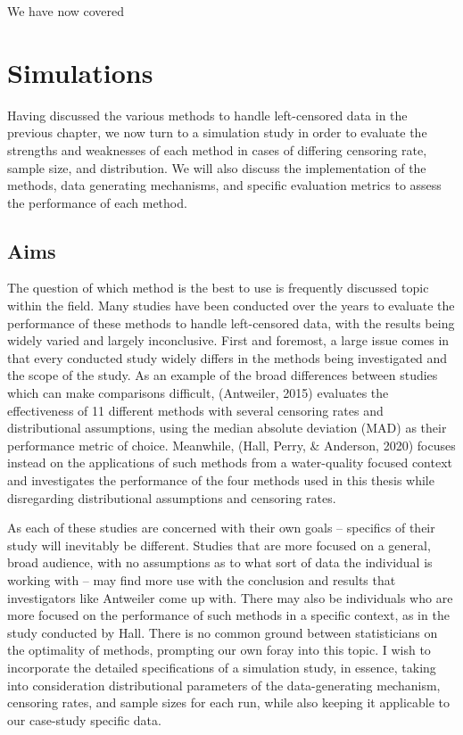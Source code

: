 \documentclass[12pt, twoside]{amherstthesis}
\begin{document}
We have now covered

\hypertarget{simulations}{%
\chapter{Simulations}\label{simulations}}

Having discussed the various methods to handle left-censored data in the previous chapter, we now turn to a simulation study in order to evaluate the strengths and weaknesses of each method in cases of differing censoring rate, sample size, and distribution. We will also discuss the implementation of the methods, data generating mechanisms, and specific evaluation metrics to assess the performance of each method.

\hypertarget{aims}{%
\section{Aims}\label{aims}}

The question of which method is the best to use is frequently discussed topic within the field. Many studies have been conducted over the years to evaluate the performance of these methods to handle left-censored data, with the results being widely varied and largely inconclusive. First and foremost, a large issue comes in that every conducted study widely differs in the methods being investigated and the scope of the study. As an example of the broad differences between studies which can make comparisons difficult, (Antweiler, 2015) evaluates the effectiveness of 11 different methods with several censoring rates and distributional assumptions, using the median absolute deviation (MAD) as their performance metric of choice. Meanwhile, (Hall, Perry, \& Anderson, 2020) focuses instead on the applications of such methods from a water-quality focused context and investigates the performance of the four methods used in this thesis while disregarding distributional assumptions and censoring rates.

As each of these studies are concerned with their own goals -- specifics of their study will inevitably be different. Studies that are more focused on a general, broad audience, with no assumptions as to what sort of data the individual is working with -- may find more use with the conclusion and results that investigators like Antweiler come up with. There may also be individuals who are more focused on the performance of such methods in a specific context, as in the study conducted by Hall. There is no common ground between statisticians on the optimality of methods, prompting our own foray into this topic. I wish to incorporate the detailed specifications of a simulation study, in essence, taking into consideration distributional parameters of the data-generating mechanism, censoring rates, and sample sizes for each run, while also keeping it applicable to our case-study specific data.
\end{document}
